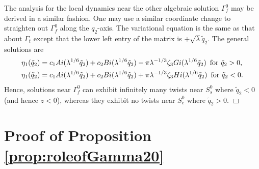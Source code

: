\documentclass[11pt]{article}
\numberwithin{equation}{section}
\begin{document}
The analysis for the local dynamics near the other algebraic solution $\Gamma_f^0$ may be derived in a similar fashion.
One may use a similar coordinate change to straighten out $\Gamma_f^0$ along the $q_2$-axis.
The variational equation is the same as that about $\Gamma_t$ except that the lower left entry of the matrix is $+\sqrt{\lambda} \tilde{q}_2$.
The general solutions are
\begin{equation*}
\begin{split}
    \eta_1(\tilde{q}_2) 
    &= c_1 Ai(\lambda^{1/6}\tilde{q}_2)
    + c_2 Bi(\lambda^{1/6}\tilde{q}_2)
    - \pi \lambda^{-1/3} \zeta_3 Gi(\lambda^{1/6}\tilde{q}_2) \, \, \, {\rm for} \, \, \tilde{q}_2>0, \\
    \eta_1(\tilde{q}_2) 
    &= c_1 Ai(\lambda^{1/6}\tilde{q}_2)
    + c_2 Bi(\lambda^{1/6}\tilde{q}_2)
    + \pi \lambda^{-1/3} \zeta_3 Hi(\lambda^{1/6}\tilde{q}_2) \, \, \, {\rm for} \, \, \tilde{q}_2<0. 
\end{split}
\end{equation*}
%
Hence, solutions near $\Gamma_f^0$ can exhibit infinitely many twists near $S^0_s$ where $\tilde{q}_2<0$ (and hence $z<0$), whereas they exhibit no twists near $S^0_c$ where $\tilde{q}_2>0$.
%
\hfill$\Box$

\section{Proof of Proposition \texorpdfstring{\ref{prop:roleofGamma20}}{Lg}}\label{app:secondgeodesing}
\end{document}
